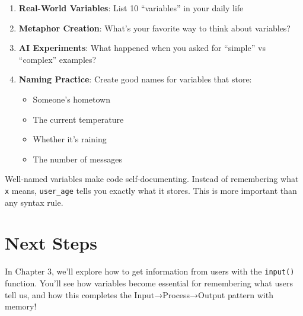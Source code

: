 \documentclass[
  letterpaper,
  DIV=11,
  numbers=noendperiod,
  oneside]{scrreprt}
\providecommand{\tightlist}{%
  \setlength{\itemsep}{0pt}\setlength{\parskip}{0pt}}\usepackage{longtable,booktabs,array}
\begin{document}
\begin{enumerate}
\def\labelenumi{\arabic{enumi}.}
\tightlist
\item
  \textbf{Real-World Variables}: List 10 ``variables'' in your daily
  life
\item
  \textbf{Metaphor Creation}: What's your favorite way to think about
  variables?
\item
  \textbf{AI Experiments}: What happened when you asked for ``simple''
  vs ``complex'' examples?
\item
  \textbf{Naming Practice}: Create good names for variables that store:

  \begin{itemize}
  \tightlist
  \item
    Someone's hometown
  \item
    The current temperature\\
  \item
    Whether it's raining
  \item
    The number of messages
  \end{itemize}
\end{enumerate}

\begin{tcolorbox}[enhanced jigsaw, opacityback=0, colback=white, colframe=quarto-callout-tip-color-frame, breakable, titlerule=0mm, coltitle=black, rightrule=.15mm, colbacktitle=quarto-callout-tip-color!10!white, left=2mm, bottomtitle=1mm, bottomrule=.15mm, title=\textcolor{quarto-callout-tip-color}{\faLightbulb}\hspace{0.5em}{The Power of Names}, opacitybacktitle=0.6, toptitle=1mm, leftrule=.75mm, arc=.35mm, toprule=.15mm]

Well-named variables make code self-documenting. Instead of remembering
what \texttt{x} means, \texttt{user\_age} tells you exactly what it
stores. This is more important than any syntax rule.

\end{tcolorbox}

\section{Next Steps}\label{next-steps-2}

In Chapter 3, we'll explore how to get information from users with the
\texttt{input()} function. You'll see how variables become essential for
remembering what users tell us, and how this completes the
Input→Process→Output pattern with memory!
\end{document}
